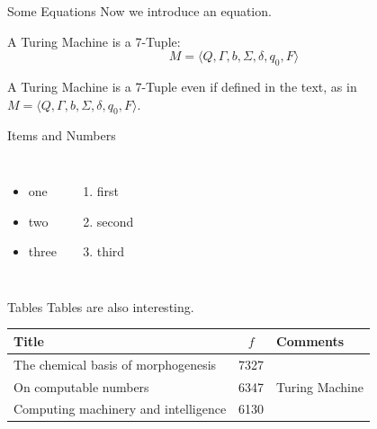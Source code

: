 \documentclass[aspectratio=169]{beamer}
\begin{document}
\begin{frame}[c]{Some Equations}
Now we introduce an equation.
    \begin{theorem}
    A Turing Machine is a 7-Tuple:
        \begin{equation}
        \label{eq:turi}
            M = \langle Q, \Gamma, b, \Sigma, \delta, q_0, F \rangle
        \end{equation}
    \end{theorem}
A Turing Machine is a 7-Tuple even if defined in the text, as in $M = \langle Q, \Gamma, b, \Sigma, \delta, q_0, F \rangle$.
\end{frame}
\begin{frame}[t]{Items and Numbers}
    \begin{columns}
            \begin{itemize}
                \item one
                \item two
                \item three
            \end{itemize}
            \begin{enumerate}
                \item first
                \item second
                \item third
            \end{enumerate}
    \end{columns}
\end{frame}
\begin{frame}[c]{Tables}
Tables are also interesting.
    \begin{table}[ht!]
    \centering
        \begin{tabular}{|l|c|l|} \hline
            Title&$f$&Comments\\ \hline
            The chemical basis of morphogenesis & 7327 & \\ \hline
            On computable numbers & 6347 & Turing Machine\\ \hline
            Computing machinery and intelligence & 6130 & \\ \hline
        \end{tabular}
    \end{table}
\end{frame}
\end{document}

